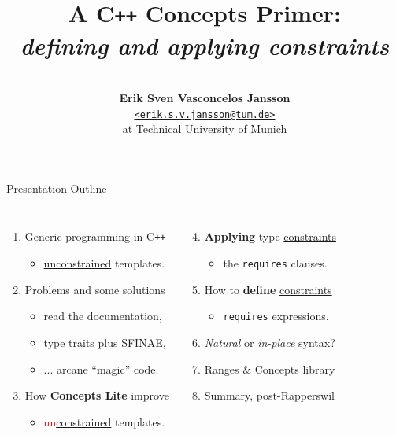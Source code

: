 \documentclass{beamer}
\title{\Large{\textbf{A C\texttt{++} Concepts Primer:}}\\
       \large{\emph{defining and applying constraints}}}
\author{\vspace{2ex}\\
        \textbf{Erik Sven Vasconcelos Jansson}\\
        {\href{mailto:erik.s.v.jansson@tum.de}
        {\texttt{<erik.s.v.jansson@tum.de>}}} \\
        {at Technical University of Munich}}
\begin{document}
    \frame{\titlepage}
    \begin{frame}{Presentation Outline}
        \begin{columns}
            \begin{enumerate}
                \item Generic programming in C\texttt{++} \begin{itemize}
                    \item{\underline{unconstrained} templates.}
                \end{itemize}
                \item Problems and some solutions \begin{itemize}
                    \item{read the documentation,}
                    \item{type traits plus SFINAE,}
                    \item{... arcane ``magic'' code.}
                \end{itemize}
                \item How \textbf{Concepts Lite} improve \begin{itemize}
                    \item{\textcolor{red}{\st{un}}\underline{constrained} templates.}
                \end{itemize}
            \end{enumerate}
            \begin{enumerate}
                \setcounter{enumi}{3}
                \item \textbf{Applying} type \underline{constraints} \begin{itemize}
                    \item the \texttt{requires} clauses.
                \end{itemize}
                \item How to \textbf{define} \underline{constraints} \begin{itemize}
                    \item \texttt{requires} expressions.
                \end{itemize}
                \item \emph{Natural} or \emph{in-place} syntax?
                \item Ranges \& Concepts library
                \item Summary, post-Rapperswil
            \end{enumerate}
        \end{columns}
    \end{frame}
\end{document}
